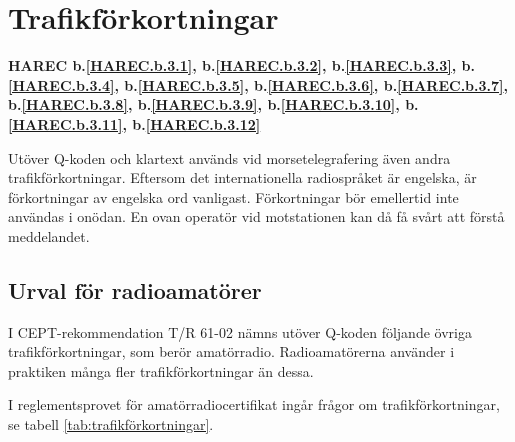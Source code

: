 \section{Trafikförkortningar}
\textbf{
HAREC b.\ref{HAREC.b.3.1}\label{myHAREC.b.3.1},
 b.\ref{HAREC.b.3.2}\label{myHAREC.b.3.2},
 b.\ref{HAREC.b.3.3}\label{myHAREC.b.3.3},
 b.\ref{HAREC.b.3.4}\label{myHAREC.b.3.4},
 b.\ref{HAREC.b.3.5}\label{myHAREC.b.3.5},
 b.\ref{HAREC.b.3.6}\label{myHAREC.b.3.6},
 b.\ref{HAREC.b.3.7}\label{myHAREC.b.3.7},
 b.\ref{HAREC.b.3.8}\label{myHAREC.b.3.8},
 b.\ref{HAREC.b.3.9}\label{myHAREC.b.3.9},
 b.\ref{HAREC.b.3.10}\label{myHAREC.b.3.10},
 b.\ref{HAREC.b.3.11}\label{myHAREC.b.3.11},
 b.\ref{HAREC.b.3.12}\label{myHAREC.b.3.12}
}

Utöver Q-koden och klartext används vid morsetelegrafering även andra
trafikförkortningar. Eftersom det internationella radiospråket är
engelska, är förkortningar av engelska ord vanligast.  Förkortningar
bör emellertid inte användas i onödan. En ovan operatör vid
motstationen kan då få svårt att förstå meddelandet.

\subsection{Urval för radioamatörer}

I CEPT-rekommendation T/R 61-02 nämns utöver Q-koden följande övriga
trafikförkortningar, som berör amatörradio.  Radioamatörerna använder
i praktiken många fler trafikförkortningar än dessa.

I reglementsprovet för amatörradiocertifikat ingår frågor om
trafikförkortningar, se tabell \ref{tab:trafikförkortningar}.

